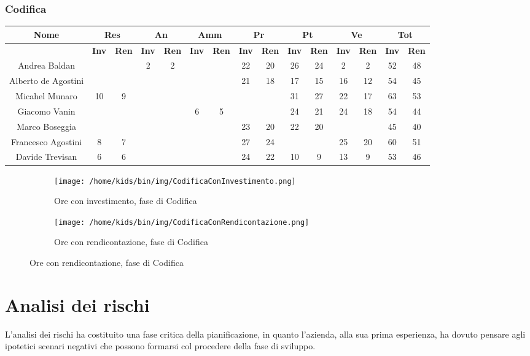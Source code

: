\documentclass{scalatekids-article}
\begin{document}
\subsubsection{Codifica}
\begin{tabular}{| c | c  c | c  c | c  c | c  c | c  c | c  c | c  c |}
  \hline
  \textbf{Nome} & \multicolumn{2}{|c|}{\textbf{Res}} & \multicolumn{2}{|c|}{\textbf{An}} & \multicolumn{2}{|c|}{\textbf{Amm}} & \multicolumn{2}{|c|}{\textbf{Pr}} & \multicolumn{2}{|c|}{\textbf{Pt}} & \multicolumn{2}{|c|}{\textbf{Ve}} & \multicolumn{2}{|c|}{\textbf{Tot}}\\
  \hline
  & \textbf{Inv} & \textbf{Ren} & \textbf{Inv} & \textbf{Ren} & \textbf{Inv} & \textbf{Ren} & \textbf{Inv} & \textbf{Ren} & \textbf{Inv} & \textbf{Ren} & \textbf{Inv} & \textbf{Ren} & \textbf{Inv} & \textbf{Ren}\\
  \hline
  Andrea Baldan & & & 2 & 2 & & & 22 & 20 & 26 & 24 & 2 & 2 & 52 & 48\\
  Alberto de Agostini & & & & & & & 21 & 18 & 17 & 15 & 16 & 12 & 54 & 45\\
  Micahel Munaro & 10 & 9 & & & & & & & 31 & 27 & 22 & 17 & 63 & 53\\
  Giacomo Vanin & & & & & 6 & 5 & & & 24 & 21 & 24 & 18 & 54 & 44\\
  Marco Boseggia & & & & & & & 23 & 20 & 22 & 20 & & & 45 & 40\\
  Francesco Agostini & 8 & 7 & & & & & 27 & 24 & & & 25 & 20 & 60 & 51\\
  Davide Trevisan & 6 & 6 & & & & & 24 & 22 & 10 & 9 & 13 & 9 & 53 & 46\\
  \hline
\end{tabular}
\begin{figure}[H]
  \begin{subfigure}[H]{0.47\textwidth}
    \texttt{[image: /home/kids/bin/img/CodificaConInvestimento.png]}
    \caption{Ore con investimento, fase di Codifica}
  \end{subfigure}
  \qquad
  \begin{subfigure}[H]{0.47\textwidth}
    \texttt{[image: /home/kids/bin/img/CodificaConRendicontazione.png]}
    \caption{Ore con rendicontazione, fase di Codifica}
  \end{subfigure}
\end{figure}
\section{Analisi dei rischi}
L'analisi dei rischi ha costituito una fase critica della pianificazione, in
quanto l'azienda, alla sua prima esperienza, ha dovuto pensare agli ipotetici
scenari negativi che possono formarsi col procedere della fase di sviluppo.
\end{document}
